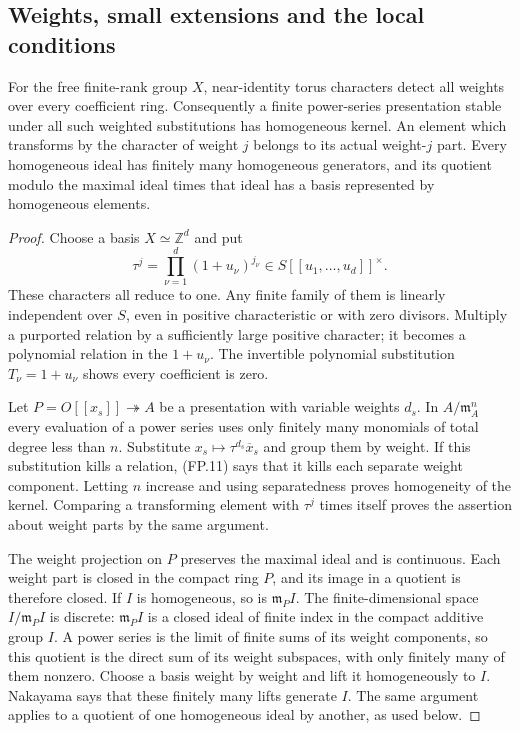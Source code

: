 
\subsection{Weights, small extensions and the local conditions}

\begin{proposition}
\label{claim:FP3}
For the free finite-rank group $X$, near-identity torus characters
detect all weights over every coefficient ring.
Consequently a finite power-series presentation stable under all
such weighted substitutions has homogeneous kernel.
An element which transforms by the character of weight $j$ belongs
to its actual weight-$j$ part.  Every homogeneous ideal has finitely
many homogeneous generators, and its quotient modulo the maximal
ideal times that ideal has a basis represented by homogeneous
elements.
\end{proposition}

\begin{proof}
Choose a basis $X\simeq\mathbb Z^d$ and put
\[
            \tau^j=\prod_{\nu=1}^d(1+u_\nu)^{j_\nu}
                    \in S[[u_1,\ldots,u_d]]^\times .
 \tag{FP.11}
\]
These characters all reduce to one.  Any finite family of them is
linearly independent over $S$, even in positive characteristic or
with zero divisors.  Multiply a purported relation by a sufficiently
large positive character; it becomes a polynomial relation in
the $1+u_\nu$.  The invertible polynomial substitution
$T_\nu=1+u_\nu$ shows every coefficient is zero.

Let $P=O[[x_s]]\twoheadrightarrow A$ be a presentation with variable
weights $d_s$.  In $A/\mathfrak m_A^n$ every evaluation of a power
series uses only finitely many monomials of total degree less than
$n$.  Substitute $x_s\mapsto\tau^{d_s}\overline x_s$ and group
them by weight.  If this substitution kills a relation, (FP.11)
says that it kills each separate weight component.
Letting $n$ increase and using separatedness proves homogeneity of
the kernel.  Comparing a transforming element with $\tau^j$ times
itself proves the assertion about weight parts by the same argument.

The weight projection on $P$ preserves the maximal ideal and is
continuous.  Each weight part is closed in the compact ring $P$,
and its image in a quotient is therefore closed.
If $I$ is homogeneous, so is $\mathfrak m_PI$.
The finite-dimensional space $I/\mathfrak m_PI$ is discrete:
$\mathfrak m_PI$ is a closed ideal of finite index in the compact
additive group $I$.  A power series is the limit of finite sums of
its weight components, so this quotient is the direct sum of its
weight subspaces, with only finitely many of them nonzero.
Choose a basis weight by weight and lift it homogeneously to $I$.
Nakayama says that these finitely many lifts generate $I$.
The same argument applies to a quotient of one homogeneous ideal
by another, as used below.
\end{proof}

